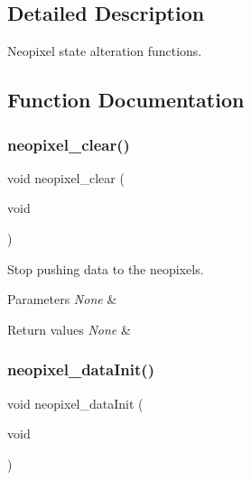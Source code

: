 \subsection{Detailed Description}
Neopixel state alteration functions. 



\subsection{Function Documentation}
\mbox{\label{group___neo_pixel___state_ga8e3cfef785ce221672f825f8785c25b8}} 
\subsubsection{\texorpdfstring{neopixel\+\_\+clear()}{neopixel\_clear()}}
{\footnotesize\ttfamily void neopixel\+\_\+clear (\begin{DoxyParamCaption}\item[{void}]{ }\end{DoxyParamCaption})}



Stop pushing data to the neopixels. 


\begin{DoxyParams}{Parameters}
{\em None} & \\
\hline
\end{DoxyParams}

\begin{DoxyRetVals}{Return values}
{\em None} & \\
\hline
\end{DoxyRetVals}
\mbox{\label{group___neo_pixel___state_ga79e34feddcfb2c45ae218166c84bdff4}} 
\subsubsection{\texorpdfstring{neopixel\+\_\+data\+Init()}{neopixel\_dataInit()}}
{\footnotesize\ttfamily void neopixel\+\_\+data\+Init (\begin{DoxyParamCaption}\item[{void}]{ }\end{DoxyParamCaption})}



